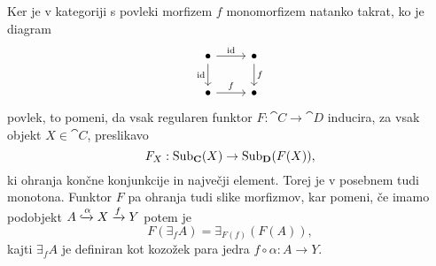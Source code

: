 \documentclass[../kategoricna_logika.tex]{subfiles}
\begin{document}
\begin{dokaz}
Ker je v kategoriji s povleki morfizem $f$ monomorfizem natanko
takrat, ko je diagram
\begin{equation*}
  \begin{tikzcd}
    \bullet \ar[d, "\mathrm{id}"'] \ar[r, "\mathrm{id}"] & \bullet \ar[d, "f"] \\
    \bullet \ar[r, "f"] & \bullet
  \end{tikzcd}
\end{equation*}
povlek, to pomeni, da vsak regularen funktor $F : \cat{C} \to \cat{D}$
inducira, za vsak objekt $X \in \cat{C}$, preslikavo
$$F_X : \operatorname{Sub}_{\operatorname{\mathbf{C}}}(X) \to \operatorname{Sub}_{\operatorname{\mathbf{D}}}(F(X)),$$
ki ohranja končne konjunkcije in največji element. Torej je v posebnem
tudi monotona.  Funktor $F$ pa ohranja tudi slike morfizmov, kar
pomeni, če imamo podobjekt
$A \xhookrightarrow{\alpha} X \xrightarrow{f} Y$ potem je
$$F(\exists_f A) = \exists_{F(f)}(F(A)),$$
kajti $\exists_f A$ je definiran kot kozožek para jedra
$f \circ \alpha : A \to Y$.
\end{dokaz}
%
%
\end{document}
